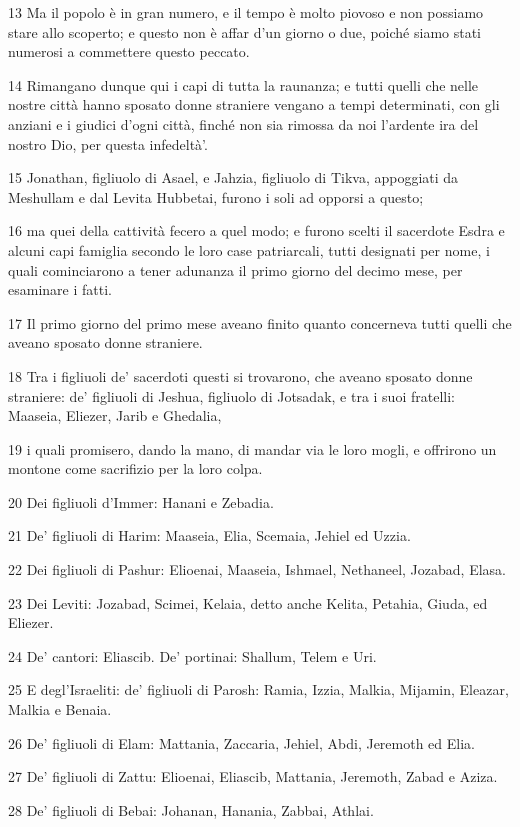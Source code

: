 \par 13 Ma il popolo è in gran numero, e il tempo è molto piovoso e non possiamo stare allo scoperto; e questo non è affar d'un giorno o due, poiché siamo stati numerosi a commettere questo peccato.
\par 14 Rimangano dunque qui i capi di tutta la raunanza; e tutti quelli che nelle nostre città hanno sposato donne straniere vengano a tempi determinati, con gli anziani e i giudici d'ogni città, finché non sia rimossa da noi l'ardente ira del nostro Dio, per questa infedeltà'.
\par 15 Jonathan, figliuolo di Asael, e Jahzia, figliuolo di Tikva, appoggiati da Meshullam e dal Levita Hubbetai, furono i soli ad opporsi a questo;
\par 16 ma quei della cattività fecero a quel modo; e furono scelti il sacerdote Esdra e alcuni capi famiglia secondo le loro case patriarcali, tutti designati per nome, i quali cominciarono a tener adunanza il primo giorno del decimo mese, per esaminare i fatti.
\par 17 Il primo giorno del primo mese aveano finito quanto concerneva tutti quelli che aveano sposato donne straniere.
\par 18 Tra i figliuoli de' sacerdoti questi si trovarono, che aveano sposato donne straniere: de' figliuoli di Jeshua, figliuolo di Jotsadak, e tra i suoi fratelli: Maaseia, Eliezer, Jarib e Ghedalia,
\par 19 i quali promisero, dando la mano, di mandar via le loro mogli, e offrirono un montone come sacrifizio per la loro colpa.
\par 20 Dei figliuoli d'Immer: Hanani e Zebadia.
\par 21 De' figliuoli di Harim: Maaseia, Elia, Scemaia, Jehiel ed Uzzia.
\par 22 Dei figliuoli di Pashur: Elioenai, Maaseia, Ishmael, Nethaneel, Jozabad, Elasa.
\par 23 Dei Leviti: Jozabad, Scimei, Kelaia, detto anche Kelita, Petahia, Giuda, ed Eliezer.
\par 24 De' cantori: Eliascib. De' portinai: Shallum, Telem e Uri.
\par 25 E degl'Israeliti: de' figliuoli di Parosh: Ramia, Izzia, Malkia, Mijamin, Eleazar, Malkia e Benaia.
\par 26 De' figliuoli di Elam: Mattania, Zaccaria, Jehiel, Abdi, Jeremoth ed Elia.
\par 27 De' figliuoli di Zattu: Elioenai, Eliascib, Mattania, Jeremoth, Zabad e Aziza.
\par 28 De' figliuoli di Bebai: Johanan, Hanania, Zabbai, Athlai.
